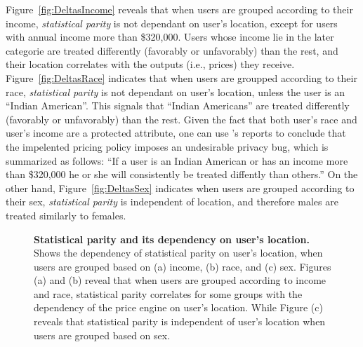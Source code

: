 Figure~\ref{fig:DeltasIncome} reveals that when users are grouped according to
their income, {\em statistical parity} is not dependant on user's location,
except for users with annual income more than \$320,000. Users whose income
lie in the later
categorie are treated differently (favorably or unfavorably) than the rest,
and their location correlates with the outputs (i.e., prices) they receive.
Figure~\ref{fig:DeltasRace} indicates that when users are groupped according
to their race, {\em statistical parity} is not dependant on user's location,
unless the user is an ``Indian American''. This signals that ``Indian
Americans'' are treated differently (favorably or unfavorably) than the rest.
Given the fact that both user's race and user's income are a protected
attribute, one can use \sysname's reports to conclude that the impelented
pricing policy imposes an undesirable privacy bug, which is
summarized as follows: ``If a user is an Indian American or has an income more
than \$320,000 he or she will consistently be treated diffently than others.''
On the other hand, Figure~\ref{fig:DeltasSex} indicates when users are grouped
according to their sex, {\em statistical parity} is independent of location,
and therefore males are treated similarly to females.

\begin{figure*}[t]
{
  \caption{\textbf{Statistical parity and its dependency on user's location.}
          Shows the dependency of statistical parity on user's location,
          when users are grouped based on (a) income, (b) race, and (c) sex.
          Figures (a) and (b) reveal that when users are grouped according to
          income and race, statistical parity correlates for some groups with
          the dependency of the price engine on user's location. While Figure
          (c) reveals that statistical parity is independent of user's location
          when users are grouped based on sex.
  }
  \label{fig:Deltas}
}
\end{figure*}

